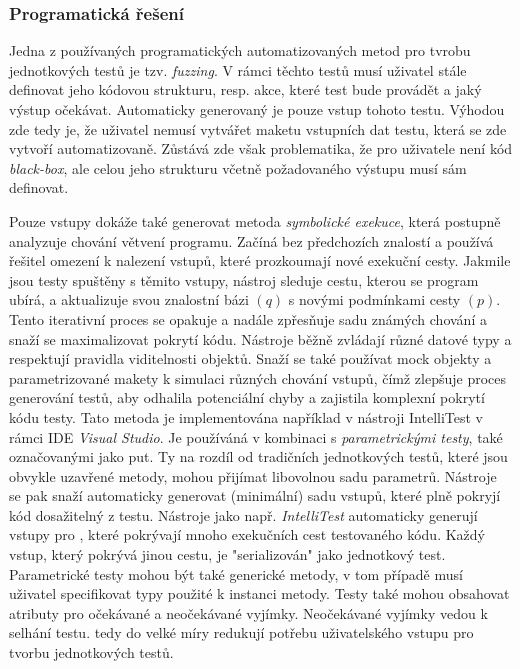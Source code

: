 \documentclass[czech, ma, kiv, he, iso690alph, pdf, viewonly]{fasthesis}
\begin{document}
        \subsubsection{Programatická řešení}
        Jedna z používaných programatických automatizovaných metod pro tvrobu jednotkových testů je tzv. \textit{fuzzing}. V rámci těchto testů musí uživatel stále definovat jeho kódovou strukturu, resp. akce, které test bude provádět a jaký výstup očekávat. Automaticky generovaný je pouze vstup tohoto testu. Výhodou zde tedy je, že uživatel nemusí vytvářet maketu vstupních dat testu, která se zde vytvoří automatizovaně. Zůstává zde však problematika, že pro uživatele není kód \emph{black-box}, ale celou jeho strukturu včetně požadovaného výstupu musí sám definovat. \cite{fuzzing}

        Pouze vstupy dokáže také generovat metoda \textit{symbolické exekuce}, která postupně analyzuje chování větvení programu. Začíná bez předchozích znalostí a používá řešitel omezení k nalezení vstupů, které prozkoumají nové exekuční cesty. Jakmile jsou testy spuštěny s těmito vstupy, nástroj sleduje cestu, kterou se program ubírá, a aktualizuje svou znalostní bázi \((q)\) s novými podmínkami cesty \((p)\). Tento iterativní proces se opakuje a nadále zpřesňuje sadu známých chování a snaží se maximalizovat pokrytí kódu. Nástroje běžně zvládají různé datové typy a respektují pravidla viditelnosti objektů. Snaží se také používat mock objekty a parametrizované makety k simulaci různých chování vstupů, čímž zlepšuje proces generování testů, aby odhalila potenciální chyby a zajistila komplexní pokrytí kódu testy. \cite{parizek_symbolic_execution} Tato metoda je implementována například v nástroji IntelliTest v rámci IDE \textit{Visual Studio}. Je používáná v kombinaci s \emph{parametrickými testy}, také označovanými jako \acrshort{put}. Ty na rozdíl od tradičních jednotkových testů, které jsou obvykle uzavřené metody, mohou přijímat libovolnou sadu parametrů. Nástroje se pak snaží automaticky generovat (minimální) sadu vstupů, které plně pokryjí kód dosažitelný z testu. Nástroje jako např. \textit{IntelliTest} automaticky generují vstupy pro , které pokrývají mnoho exekučních cest testovaného kódu. Každý vstup, který pokrývá jinou cestu, je "serializován" jako jednotkový test. Parametrické testy mohou být také generické metody, v tom případě musí uživatel specifikovat typy použité k instanci metody. Testy také mohou obsahovat atributy pro očekávané a neočekávané vyjímky. Neočekávané vyjímky vedou k selhání testu.  tedy do velké míry redukují potřebu uživatelského vstupu pro tvorbu jednotkových testů. \cite{IntelliTestInputGeneration2023} \cite{microsoft2023testgen}
\end{document}
